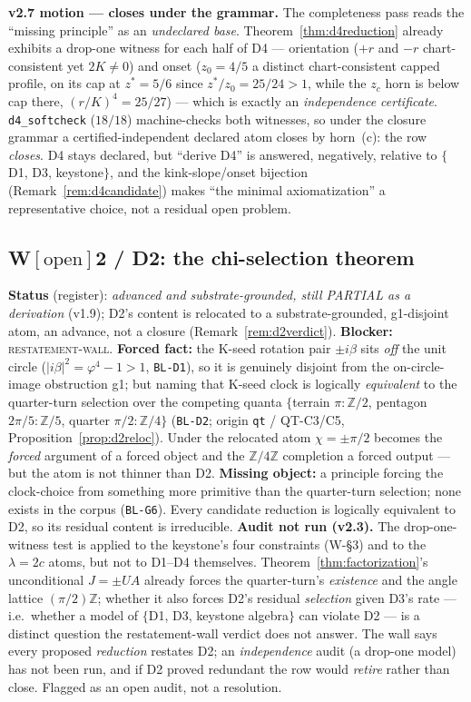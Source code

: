 \documentclass[11pt]{article}
\newcommand{\hx}[1]{\textcolor{cC}{\footnotesize\texttt{#1}}}
\newcommand{\Z}{\mathbb{Z}}
\newcommand{\gp}{\varphi}
\theoremstyle{plain}
\theoremstyle{definition}
\theoremstyle{remark}
\begin{document}
\smallskip\noindent
\textbf{v2.7 motion --- closes under the grammar.} The completeness pass reads the
``missing principle'' as an \emph{undeclared base}. Theorem~\ref{thm:d4reduction}
already exhibits a drop-one witness for each half of D4 --- orientation ($+r$ and
$-r$ chart-consistent yet $2K\ne0$) and onset ($z_0=4/5$ a distinct chart-consistent
capped profile, on its cap at $z^\ast=5/6$ since $z^\ast/z_0=25/24>1$, while the
$z_c$ horn is below cap there, $(r/K)^4=25/27$) --- which is exactly an
\emph{independence certificate}. \texttt{d4\_softcheck} ($18/18$) machine-checks both
witnesses, so under the closure grammar a certified-independent declared atom closes
by horn~(c): the row \emph{closes}. D4 stays declared, but ``derive D4'' is answered,
negatively, relative to $\{$D1, D3, keystone$\}$, and the kink-slope/onset bijection
(Remark~\ref{rem:d4candidate}) makes ``the minimal axiomatization'' a representative
choice, not a residual open problem.

\subsection{W\texorpdfstring{$[\text{open}]$}{[open]}2 / D2: the chi-selection theorem}\label{blk:d2}
\textbf{Status} (register): \emph{advanced and substrate-grounded, still
PARTIAL as a derivation} (v1.9); D2's content is relocated to a
substrate-grounded, g1-disjoint atom, an advance, not a closure
(Remark~\ref{rem:d2verdict}). \textbf{Blocker:} \textsc{restatement-wall}.
\textbf{Forced fact:} the K-seed rotation pair $\pm i\beta$ sits \emph{off} the
unit circle ($|i\beta|^2=\gp^4-1>1$, \hx{BL-D1}), so it is genuinely disjoint
from the on-circle-image obstruction g1; but naming that K-seed clock is
logically \emph{equivalent} to the quarter-turn selection over the competing
quanta $\{$terrain $\pi:\Z/2$, pentagon $2\pi/5:\Z/5$, quarter $\pi/2:\Z/4\}$
(\hx{BL-D2}; origin \texttt{qt} / QT-C3/C5, Proposition~\ref{prop:d2reloc}).
Under the relocated atom $\chi=\pm\pi/2$ becomes the \emph{forced} argument of a
forced object and the $\Z/4\Z$ completion a forced output --- but the atom is not
thinner than D2. \textbf{Missing object:} a principle forcing the clock-choice
from something more primitive than the quarter-turn selection; none exists in the
corpus (\hx{BL-G6}). Every candidate reduction is logically equivalent to D2, so
its residual content is irreducible.
\textbf{Audit not run (v2.3).} The drop-one-witness test is applied to the
keystone's four constraints (W-\S3) and to the $\lambda=2c$ atoms, but not to
D1--D4 themselves. Theorem~\ref{thm:factorization}'s unconditional $J=\pm UA$
already forces the quarter-turn's \emph{existence} and the angle lattice
$(\pi/2)\Z$; whether it also forces D2's residual \emph{selection} given D3's rate
--- i.e.\ whether a model of $\{$D1, D3, keystone algebra$\}$ can violate D2 ---
is a distinct question the restatement-wall verdict does not answer. The wall says
every proposed \emph{reduction} restates D2; an \emph{independence} audit (a
drop-one model) has not been run, and if D2 proved redundant the row would
\emph{retire} rather than close. Flagged as an open audit, not a resolution.
\end{document}
